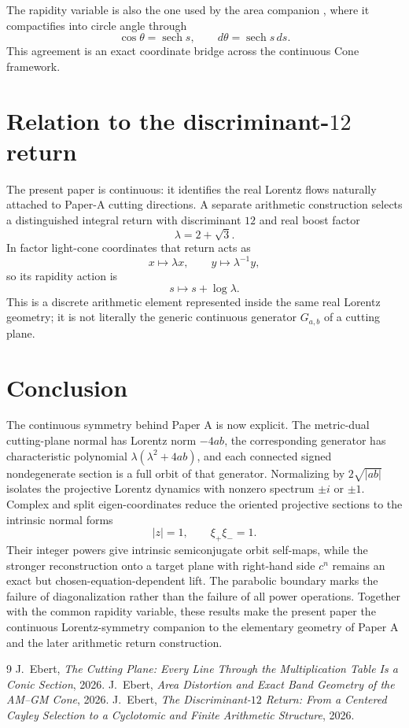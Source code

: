 \documentclass[11pt]{amsart}
\theoremstyle{remark}
\begin{document}
The rapidity variable is also the one used by the area companion \cite{Ebert2026Area}, where it compactifies into circle angle through
\[
\cos\theta=\operatorname{sech}s,
\qquad
d\theta=\operatorname{sech}s\,ds.
\]
This agreement is an exact coordinate bridge across the continuous Cone framework.

\section{Relation to the discriminant-$12$ return}

The present paper is continuous: it identifies the real Lorentz flows naturally attached to Paper-A cutting directions.  A separate arithmetic construction \cite{Ebert2026D12} selects a distinguished integral return with discriminant $12$ and real boost factor
\[
\lambda=2+\sqrt3.
\]
In factor light-cone coordinates that return acts as
\[
x\mapsto\lambda x,
\qquad
y\mapsto\lambda^{-1}y,
\]
so its rapidity action is
\[
s\mapsto s+\log\lambda.
\]
This is a discrete arithmetic element represented inside the same real Lorentz geometry; it is not literally the generic continuous generator $G_{a,b}$ of a cutting plane.

\section{Conclusion}

The continuous symmetry behind Paper A is now explicit.  The metric-dual cutting-plane normal has Lorentz norm $-4ab$, the corresponding generator has characteristic polynomial $\lambda(\lambda^2+4ab)$, and each connected signed nondegenerate section is a full orbit of that generator.  Normalizing by $2\sqrt{|ab|}$ isolates the projective Lorentz dynamics with nonzero spectrum $\pm i$ or $\pm1$.  Complex and split eigen-coordinates reduce the oriented projective sections to the intrinsic normal forms
\[
|z|=1,
\qquad
\xi_+\xi_-=1.
\]
Their integer powers give intrinsic semiconjugate orbit self-maps, while the stronger reconstruction onto a target plane with right-hand side $c^n$ remains an exact but chosen-equation-dependent lift.  The parabolic boundary marks the failure of diagonalization rather than the failure of all power operations.  Together with the common rapidity variable, these results make the present paper the continuous Lorentz-symmetry companion to the elementary geometry of Paper A and the later arithmetic return construction.

\begin{thebibliography}{9}
 J.~Ebert, \emph{The Cutting Plane: Every Line Through the Multiplication Table Is a Conic Section}, 2026.
 J.~Ebert, \emph{Area Distortion and Exact Band Geometry of the AM--GM Cone}, 2026.
 J.~Ebert, \emph{The Discriminant-$12$ Return: From a Centered Cayley Selection to a Cyclotomic and Finite Arithmetic Structure}, 2026.
\end{thebibliography}
\end{document}
